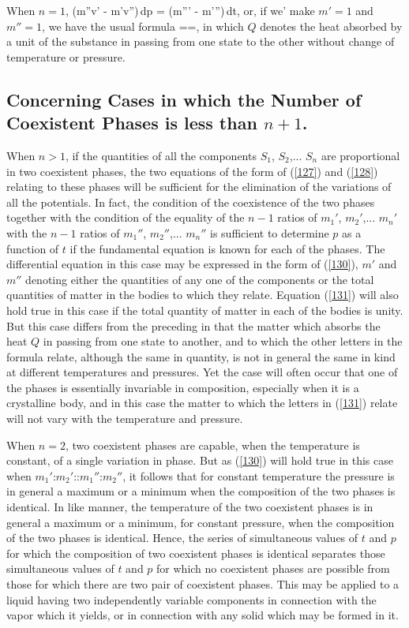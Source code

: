 \documentclass[12pt]{article}
\begin{document}
When $n= 1$,
\eqs (m''v' - m'v'')\,dp = (m''\eta' - m'\eta'')\,dt, \label{130}\eqe
or, if we' make $m'= 1$ and $m''= 1$, we have the usual formula
\eqs 
{}==, \label{131}\eqe
in which $Q$ denotes the heat absorbed by a unit of the substance in passing from one state to the other without change of temperature or pressure.

\subsection{Concerning Cases in which the Number of Coexistent Phases is less than $n+ 1$.}
When $n > 1$, if the quantities of all the components $S_1$, $S_2$,... $S_n$ are proportional in two coexistent phases, the two equations of the form of (\ref{127}) and (\ref{128}) relating to these phases will be sufficient for the elimination of the variations of all the potentials. In fact, the condition of the coexistence of the two phases together with the condition of the equality of the $n-1$ ratios of $m_1'$, $m_2'$,... $m_n'$ with the $n-1$ ratios of $m_1''$, $m_2''$,... $m_n''$ is sufficient to determine $p$ as a function of $t$ if the fundamental equation is known for each of the phases. The differential equation in this case may be expressed in the form of (\ref{130}), $m'$ and $m''$ denoting either the quantities of any one of the components or the total quantities of matter in the bodies to which they relate. Equation (\ref{131}) will also hold true in this case if the total quantity of matter in each of the bodies is unity. But this case differs from the preceding in that the matter which absorbs the heat $Q$ in passing from one state to another, and to which the other letters in the formula relate, although the same in quantity, is not in general the same in kind at different temperatures and pressures. Yet the case will often occur that one of the phases is essentially invariable in composition, especially when it is a crystalline body, and in this case the matter to which the letters in (\ref{131}) relate will not vary with the temperature and pressure.


When $n=2$, two coexistent phases are capable, when the temperature is constant, of a single variation in phase. But as (\ref{130}) will hold true in this case when $m_1'$:$m_2'$::$m_1''$:$m_2''$, it follows that for constant temperature the pressure is in general a maximum or a minimum when the composition of the two phases is identical. In like manner, the temperature of the two coexistent phases is in general a maximum or a minimum, for constant pressure, when the composition of the two phases is identical. Hence, the series of simultaneous values of $t$ and $p$ for which the composition of two coexistent phases is identical separates those simultaneous values of $t$ and $p$ for which no coexistent phases are possible from those for which there are two pair of coexistent phases. This may be applied to a liquid having two independently variable components in connection with the vapor which it yields, or in connection with any solid which may be formed in it.
\end{document}
